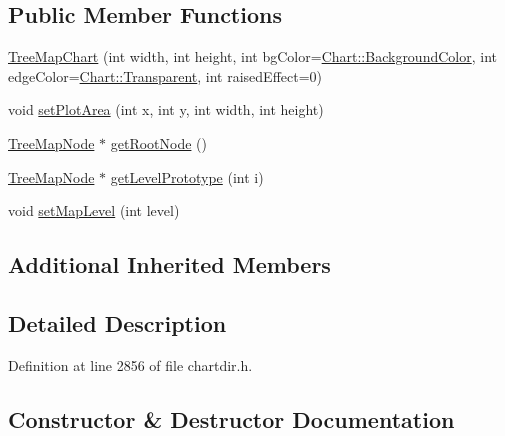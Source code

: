 \subsection*{Public Member Functions}
\begin{DoxyCompactItemize}
\item 
\hyperlink{class_tree_map_chart_af8b6f364bd9d8e1678e696bb855beeb9}{Tree\+Map\+Chart} (int width, int height, int bg\+Color=\hyperlink{namespace_chart_abee0d882fdc9ad0b001245ad9fc64011a134193bde693b9d152d0c6dc59fa7d7f}{Chart\+::\+Background\+Color}, int edge\+Color=\hyperlink{namespace_chart_abee0d882fdc9ad0b001245ad9fc64011afc6811800a9e2582dac0157b6279f836}{Chart\+::\+Transparent}, int raised\+Effect=0)
\item 
void \hyperlink{class_tree_map_chart_a23395c32c80a297aacbf1d17b3ff5932}{set\+Plot\+Area} (int x, int y, int width, int height)
\item 
\hyperlink{class_tree_map_node}{Tree\+Map\+Node} $\ast$ \hyperlink{class_tree_map_chart_a75161aecc888f38bd2f12ac69f380a4a}{get\+Root\+Node} ()
\item 
\hyperlink{class_tree_map_node}{Tree\+Map\+Node} $\ast$ \hyperlink{class_tree_map_chart_a6a8f50c363473cd412a4b8b8e2b40cef}{get\+Level\+Prototype} (int i)
\item 
void \hyperlink{class_tree_map_chart_a5ab2226f46d6f24865768260ae19f51d}{set\+Map\+Level} (int level)
\end{DoxyCompactItemize}
\subsection*{Additional Inherited Members}


\subsection{Detailed Description}


Definition at line 2856 of file chartdir.\+h.



\subsection{Constructor \& Destructor Documentation}
\mbox{\label{class_tree_map_chart_af8b6f364bd9d8e1678e696bb855beeb9}} 
